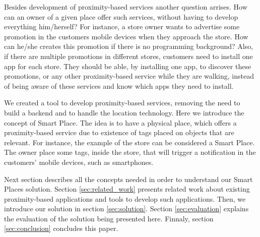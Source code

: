 Besides development of proximity-based services another question arrises.
How can an owner of a given place offer such services, without having to develop everything him/herself?
For instance, a store owner wants to advertise some promotion in the customers mobile devices when they approach the store.
How can he/she creates this promotion if there is no programming background?
Also, if there are multiple promotions in different stores, customers need to install one app for each store.
They should be able, by installing one app, to discover these promotions, or any other proximity-based service while they are walking, instead of being aware of these services and know which apps they need to install.

We created a tool to develop proximity-based services, removing the need to build a backend and to handle the location technology.
Here we introduce the concept of Smart Place.
The idea is to have a physical place, which offers a proximity-based service due to existence of tags placed on objects that are relevant.
For instance, the example of the store can be considered a Smart Place.
The owner place some tags, inside the store, that will trigger a notification in the customers' mobile devices, such as smartphones.

Next section describes all the concepts needed in order to understand our Smart Places solution.
Section \ref{sec:related_work} presents related work about existing proximity-based applications and tools to develop such applications.
Then, we introduce our solution in section \ref{sec:solution}.
Section \ref{sec:evaluation} explains the evaluation of the solution being presented here.
Finnaly, section \ref{sec:conclusion} concludes this paper.
